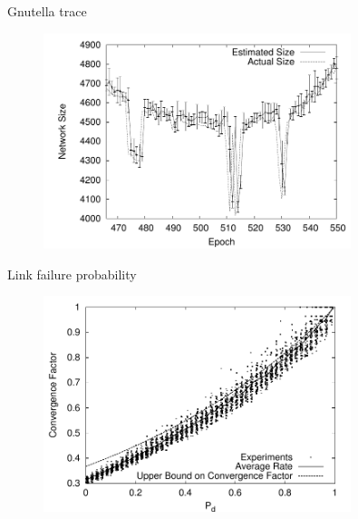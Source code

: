 \begin{frame}{Gnutella trace}

\begin{figure}
\includegraphics[width=0.80\textwidth]{figs/11/subtrace}
\end{figure}

\end{frame}


\begin{frame}{Link failure probability}
	
\begin{figure}
\includegraphics[width=0.80\textwidth]{figs/11/newscast-fail-sym}
\end{figure}

		
\end{frame}

